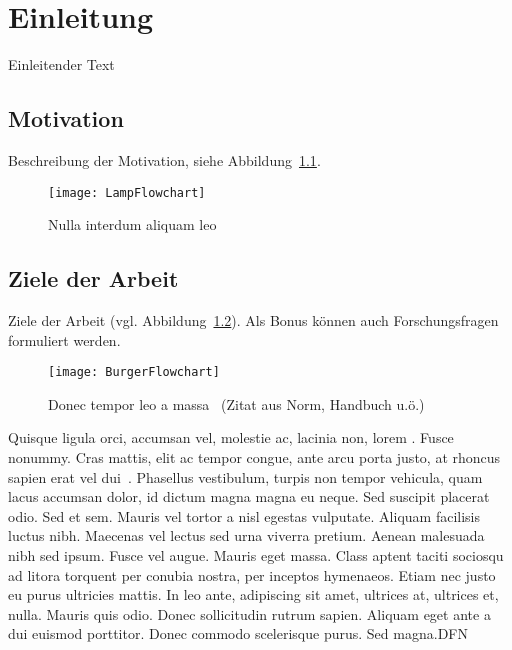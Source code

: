 \chapter{Einleitung}
\label{sec:einleitung}

Einleitender Text

\section{Motivation}

Beschreibung der Motivation, siehe Abbildung~\ref{fig:LampFlowchart}.

\begin{figure}[htb]
  \centering
  \texttt{[image: LampFlowchart]}\\ %
  \caption{Nulla interdum aliquam leo}\label{fig:LampFlowchart}
\end{figure}


\section{Ziele der Arbeit}

Ziele der Arbeit (vgl. Abbildung~\ref{fig:BurgerFlowchart}). Als Bonus können auch Forschungsfragen formuliert werden.

\begin{figure}[htb]
  \centering
  \texttt{[image: BurgerFlowchart]}\\ %
  \caption{Donec tempor leo a massa~\cite{praxisbuch2017} (Zitat aus Norm, Handbuch u.ö.)}\label{fig:BurgerFlowchart}
\end{figure}

Quisque ligula orci, accumsan vel, molestie ac, lacinia non, lorem . Fusce nonummy. Cras mattis, elit ac tempor congue, ante arcu porta justo, at rhoncus sapien erat vel dui~\cite{latexbib}. Phasellus vestibulum, turpis non tempor vehicula, quam lacus accumsan dolor, id dictum magna magna eu neque. Sed suscipit placerat odio. Sed et sem. Mauris vel tortor a nisl egestas vulputate. Aliquam facilisis luctus nibh. Maecenas vel lectus sed urna viverra pretium. Aenean malesuada nibh sed ipsum. Fusce vel augue. Mauris eget massa. Class aptent taciti sociosqu ad litora torquent per conubia nostra, per inceptos hymenaeos. Etiam nec justo eu purus ultricies mattis. In leo ante, adipiscing sit amet, ultrices at, ultrices et, nulla. Mauris quis odio. Donec sollicitudin rutrum sapien. Aliquam eget ante a dui euismod porttitor. Donec commodo scelerisque purus. Sed magna.\ac{DFN}

